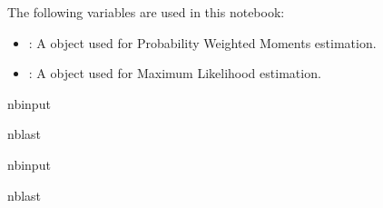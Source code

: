 \documentclass[a4paper,11pt,openany,english]{sphinxmanual}
\begin{document}
\sphinxAtStartPar
The following variables are used in this notebook:
\begin{itemize}
\item {} 
\sphinxAtStartPar
{}: A  object used for Probability Weighted Moments estimation.

\item {} 
\sphinxAtStartPar
{}: A  object used for Maximum Likelihood estimation.

\end{itemize}

\begin{sphinxuseclass}{nbinput}
\begin{sphinxuseclass}{nblast}
{
\begin{sphinxVerbatim}[commandchars=\\\{\}]
\llap{\color{nbsphinxin}[1]:\,\hspace{\fboxrule}\hspace{\fboxsep}}   
   
\end{sphinxVerbatim}
}

\end{sphinxuseclass}
\end{sphinxuseclass}
\begin{sphinxuseclass}{nbinput}
\begin{sphinxuseclass}{nblast}
{
\begin{sphinxVerbatim}[commandchars=\\\{\}]
\llap{\color{nbsphinxin}[2]:\,\hspace{\fboxrule}\hspace{\fboxsep}}   
\end{sphinxVerbatim}
}

\end{sphinxuseclass}
\end{sphinxuseclass}
\end{document}
